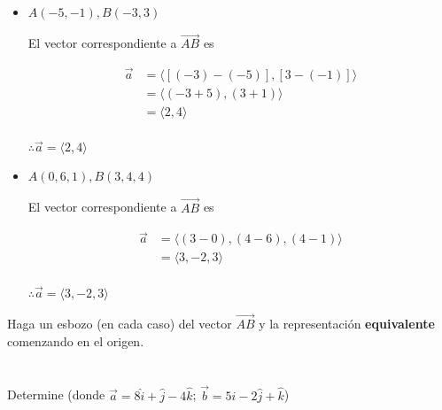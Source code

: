 \documentclass[12pt]{article}
\begin{document}
\begin{itemize}
  
\item $A(-5,-1) , B(-3,3)$

  El vector correspondiente a $\vec{AB}$ es

  \begin{align*}
    \vec{a}
    &=
    \langle
    [(-3)-(-5)],
    [3-(-1)]
    \rangle \\
    &=
    \langle
    (-3+5),
    (3+1)
    \rangle \\
    &=
    \langle
    2,
    4
    \rangle \\
  \end{align*}

  $\therefore \vec{a} = \langle 2, 4 \rangle$
  
\item $A(0,6,1), B(3,4,4)$

  El vector correspondiente a $\vec{AB}$ es

  \begin{align*}
    \vec{a}
    &=
    \langle
    (3-0),
    (4-6),
    (4-1)
    \rangle \\
    &=
    \langle
    3,
    -2,
    3
    \rangle \\
  \end{align*}

  $\therefore \vec{a} = \langle 3, -2, 3 \rangle$
  
\end{itemize}

Haga un esbozo (en cada caso) del vector $\vec{AB}$ y la representación \textbf{equivalente} comenzando en el origen.

\section{}

Determine (donde $\vec{a}=8\hat{i} + \hat{j} - 4\hat{k}$; $\vec{b}= 5\hat{i} - 2\hat{j} +\hat{k}$)
\end{document}
